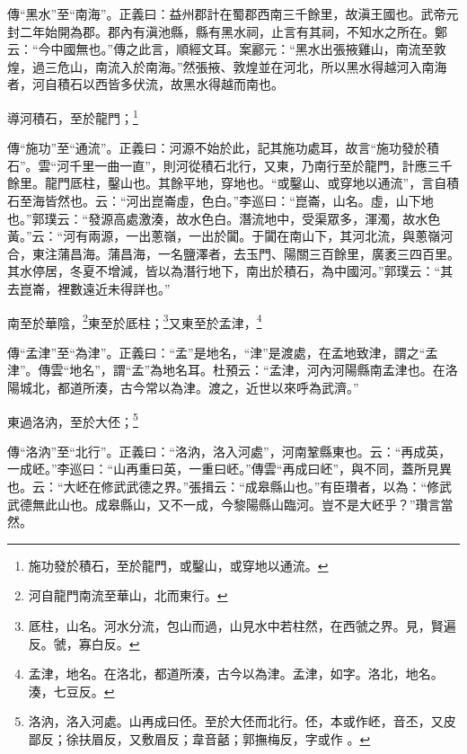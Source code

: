 {\noindent\zhuan{}\fzbyks 傳“黑水”至“南海”。正義曰：益州郡計在蜀郡西南三千餘里，故滇王國也。武帝元封二年始開為郡。郡內有滇池縣，縣有黑水祠，止言有其祠，不知水之所在。鄭云：“今中國無也。”傳之此言，順經文耳。案酈元：“黑水出張掖雞山，南流至敦煌，過三危山，南流入於南海。”然張掖、敦煌並在河北，所以黑水得越河入南海者，河自積石以西皆多伏流，故黑水得越而南也。 \par}

導河積石，至於龍門；\footnote{施功發於積石，至於龍門，或鑿山，或穿地以通流。}

{\noindent\zhuan{}\fzbyks 傳“施功”至“通流”。正義曰：河源不始於此，記其施功處耳，故言“施功發於積石”。雲“河千里一曲一直”，則河從積石北行，又東，乃南行至於龍門，計應三千餘里。龍門厎柱，鑿山也。其餘平地，穿地也。“或鑿山、或穿地以通流”，言自積石至海皆然也。云：“河出崑崙虛，色白。”李巡曰：“崑崙，山名。虛，山下地也。”郭璞云：“發源高處激湊，故水色白。潛流地中，受渠眾多，渾濁，故水色黃。”云：“河有兩源，一出蔥嶺，一出於闐。于闐在南山下，其河北流，與蔥嶺河合，東注蒲昌海。蒲昌海，一名鹽澤者，去玉門、陽關三百餘里，廣袤三四百里。其水停居，冬夏不增減，皆以為潛行地下，南出於積石，為中國河。”郭璞云：“其去崑崙，裡數遠近未得詳也。” \par}

南至於華陰，\footnote{河自龍門南流至華山，北而東行。}東至於厎柱；\footnote{厎柱，山名。河水分流，包山而過，山見水中若柱然，在西虢之界。見，賢遍反。虢，寡白反。}又東至於孟津，\footnote{孟津，地名。在洛北，都道所湊，古今以為津。孟津，如字。洛北，地名。湊，七豆反。}

{\noindent\zhuan{}\fzbyks 傳“孟津”至“為津”。正義曰：“孟”是地名，“津”是渡處，在孟地致津，謂之“孟津”。傳雲“地名”，謂“孟”為地名耳。杜預云：“孟津，河內河陽縣南孟津也。在洛陽城北，都道所湊，古今常以為津。渡之，近世以來呼為武濟。” \par}

東過洛汭，至於大伾；\footnote{洛汭，洛入河處。山再成曰伾。至於大伾而北行。伾，本或作岯，音丕，又皮鄙反；徐扶眉反，又敷眉反；韋音嚭；郭撫梅反，字或作 。}

{\noindent\zhuan{}\fzbyks 傳“洛汭”至“北行”。正義曰：“洛汭，洛入河處”，河南鞏縣東也。云：“再成英，一成岯。”李巡曰：“山再重曰英，一重曰岯。”傳雲“再成曰岯”，與不同，蓋所見異也。云：“大岯在修武武德之界。”張揖云：“成皋縣山也。”有臣瓚者，以為：“修武武德無此山也。成皋縣山，又不一成，今黎陽縣山臨河。豈不是大岯乎？”瓚言當然。 \par}


